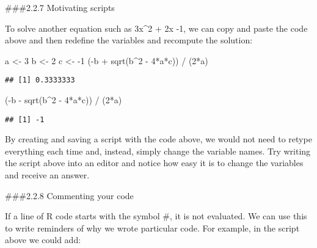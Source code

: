 \documentclass[
]{article}
\newenvironment{Shaded}{\begin{snugshade}}{\end{snugshade}}
\newcommand{\DecValTok}[1]{\textcolor[rgb]{0.00,0.00,0.81}{#1}}
\newcommand{\FunctionTok}[1]{\textcolor[rgb]{0.00,0.00,0.00}{#1}}
\newcommand{\NormalTok}[1]{#1}
\newcommand{\OtherTok}[1]{\textcolor[rgb]{0.56,0.35,0.01}{#1}}
\newcommand{\SpecialCharTok}[1]{\textcolor[rgb]{0.00,0.00,0.00}{#1}}
\begin{document}
\#\#\#2.2.7 Motivating scripts

To solve another equation such as 3x\^{}2 + 2x -1, we can copy and paste
the code above and then redefine the variables and recompute the
solution:

\begin{Shaded}
\begin{Highlighting}[]
\NormalTok{a }\OtherTok{\textless{}{-}} \DecValTok{3}
\NormalTok{b }\OtherTok{\textless{}{-}} \DecValTok{2}
\NormalTok{c }\OtherTok{\textless{}{-}} \SpecialCharTok{{-}}\DecValTok{1}
\NormalTok{(}\SpecialCharTok{{-}}\NormalTok{b }\SpecialCharTok{+} \FunctionTok{sqrt}\NormalTok{(b}\SpecialCharTok{\^{}}\DecValTok{2} \SpecialCharTok{{-}} \DecValTok{4}\SpecialCharTok{*}\NormalTok{a}\SpecialCharTok{*}\NormalTok{c)) }\SpecialCharTok{/}\NormalTok{ (}\DecValTok{2}\SpecialCharTok{*}\NormalTok{a)}
\end{Highlighting}
\end{Shaded}

\begin{verbatim}
## [1] 0.3333333
\end{verbatim}

\begin{Shaded}
\begin{Highlighting}[]
\NormalTok{(}\SpecialCharTok{{-}}\NormalTok{b }\SpecialCharTok{{-}} \FunctionTok{sqrt}\NormalTok{(b}\SpecialCharTok{\^{}}\DecValTok{2} \SpecialCharTok{{-}} \DecValTok{4}\SpecialCharTok{*}\NormalTok{a}\SpecialCharTok{*}\NormalTok{c)) }\SpecialCharTok{/}\NormalTok{ (}\DecValTok{2}\SpecialCharTok{*}\NormalTok{a)}
\end{Highlighting}
\end{Shaded}

\begin{verbatim}
## [1] -1
\end{verbatim}

By creating and saving a script with the code above, we would not need
to retype everything each time and, instead, simply change the variable
names. Try writing the script above into an editor and notice how easy
it is to change the variables and receive an answer.

\#\#\#2.2.8 Commenting your code

If a line of R code starts with the symbol \#, it is not evaluated. We
can use this to write reminders of why we wrote particular code. For
example, in the script above we could add:
\end{document}
